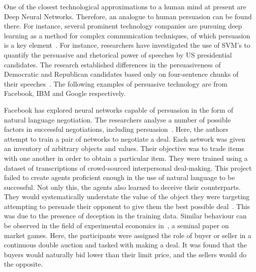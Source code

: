 One of the closest technological approximations to a human mind at present are Deep Neural Networks. Therefore, an analogue to human persuasion can be found there. For instance, several prominent technology companies are pursuing deep learning as a method for complex communication techniques, of which persuasion is a key element~\cite{Dulac-Arnold2015DeepSpaces, Lowe2019OnCommunication, Guo2017LearningTexts}. For instance, researchers have investigated the use of SVM's to quantify the persuasive and rhetorical power of speeches by US presidential candidates. The research established differences in the persuasiveness of Democratic and Republican candidates based only on four-sentence chunks of their speeches~\cite{Strapparava2010PredictingDiscourses}. The following examples of persuasive technology are from Facebook, IBM and Google respectively.

Facebook has explored neural networks capable of persuasion in the form of natural language negotiation. The researchers analyse a number of possible factors in successful negotiations, including persuasion~\cite{Lewis2017DealDialogues}. Here, the authors attempt to train a pair of networks to negotiate a deal. Each network was given an inventory of arbitrary objects and values. Their objective was to trade items with one another in order to obtain a particular item. They were trained using a dataset of transcriptions of crowd-sourced interpersonal deal-making. This project failed to create agents proficient enough in the use of natural language to be successful. Not only this, the agents also learned to deceive their counterparts. They would systematically understate the value of the object they were targeting attempting to persuade their opponent to give them the best possible deal~\cite{Lewis2017DealDialogues}. This was due to the presence of deception in the training data. Similar behaviour can be observed in the field of experimental economics in~\cite{Smith1976ExperimentalTheory}, a seminal paper on market games. Here, the participants were assigned the role of buyer or seller in a continuous double auction and tasked with making a deal. It was found that the buyers would naturally bid lower than their limit price, and the sellers would do the opposite.

